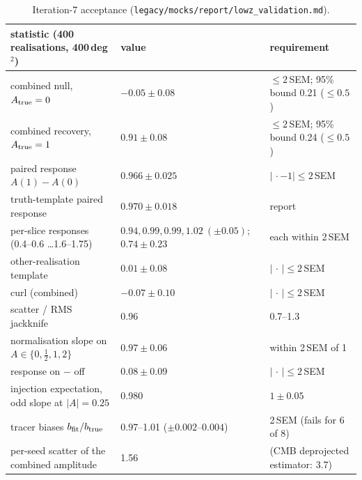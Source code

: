 \documentclass[11pt,a4paper]{article}
\begin{document}
\begin{table}
\centering\footnotesize
\begin{tabular}{lll}
\toprule
statistic (400 realisations, 400\,deg$^2$) & value & requirement\\
\midrule
combined null, $A_{\rm true}=0$ & $-0.05\pm0.08$ & $\le2$\,SEM; 95\% bound 0.21 ($\le0.5$)\\
combined recovery, $A_{\rm true}=1$ & $0.91\pm0.08$ & $\le2$\,SEM; 95\% bound 0.24 ($\le0.5$)\\
paired response $A(1)-A(0)$ & $0.966\pm0.025$ & $|\,\cdot-1|\le2$\,SEM\\
truth-template paired response & $0.970\pm0.018$ & report\\
per-slice responses (0.4--0.6 \ldots 1.6--1.75) & $0.94,0.99,0.99,1.02\ (\pm0.05)$; $0.74\pm0.23$ & each within 2\,SEM\\
other-realisation template & $0.01\pm0.08$ & $|\,\cdot\,|\le2$\,SEM\\
curl (combined) & $-0.07\pm0.10$ & $|\,\cdot\,|\le2$\,SEM\\
scatter / RMS jackknife & 0.96 & 0.7--1.3\\
normalisation slope on $A\in\{0,\tfrac12,1,2\}$ & $0.97\pm0.06$ & within 2\,SEM of 1\\
response on $-$ off & $0.08\pm0.09$ & $|\,\cdot\,|\le2$\,SEM\\
injection expectation, odd slope at $|A|=0.25$ & 0.980 & $1\pm0.05$\\
tracer biases $b_{\rm fit}/b_{\rm true}$ & 0.97--1.01 ($\pm0.002$--$0.004$) & 2\,SEM (fails for 6 of 8)\\
per-seed scatter of the combined amplitude & 1.56 & (CMB deprojected estimator: 3.7)\\
\bottomrule
\end{tabular}
\caption{Iteration-7 acceptance (\texttt{legacy/mocks/report/lowz\_validation.md}).}
\label{tab:mock}
\end{table}
\end{document}
